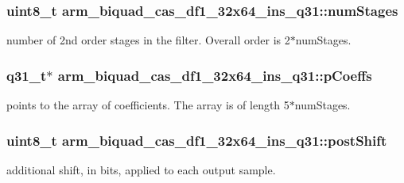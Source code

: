 \subsubsection[{\texorpdfstring{num\+Stages}{numStages}}]{\setlength{\rightskip}{0pt plus 5cm}uint8\+\_\+t arm\+\_\+biquad\+\_\+cas\+\_\+df1\+\_\+32x64\+\_\+ins\+\_\+q31\+::num\+Stages}\hypertarget{structarm__biquad__cas__df1__32x64__ins__q31_ad7cb9a9f5df8f4fcfc7a0b633672e574}{}\label{structarm__biquad__cas__df1__32x64__ins__q31_ad7cb9a9f5df8f4fcfc7a0b633672e574}
number of 2nd order stages in the filter. Overall order is 2$\ast$num\+Stages. 
\subsubsection[{\texorpdfstring{p\+Coeffs}{pCoeffs}}]{\setlength{\rightskip}{0pt plus 5cm}q31\+\_\+t$\ast$ arm\+\_\+biquad\+\_\+cas\+\_\+df1\+\_\+32x64\+\_\+ins\+\_\+q31\+::p\+Coeffs}\hypertarget{structarm__biquad__cas__df1__32x64__ins__q31_a490462d6ebe0fecfb6acbf51bed22ecf}{}\label{structarm__biquad__cas__df1__32x64__ins__q31_a490462d6ebe0fecfb6acbf51bed22ecf}
points to the array of coefficients. The array is of length 5$\ast$num\+Stages. 
\subsubsection[{\texorpdfstring{post\+Shift}{postShift}}]{\setlength{\rightskip}{0pt plus 5cm}uint8\+\_\+t arm\+\_\+biquad\+\_\+cas\+\_\+df1\+\_\+32x64\+\_\+ins\+\_\+q31\+::post\+Shift}\hypertarget{structarm__biquad__cas__df1__32x64__ins__q31_a8e9d58e8dba5aa3b2fc4f36d2ed07996}{}\label{structarm__biquad__cas__df1__32x64__ins__q31_a8e9d58e8dba5aa3b2fc4f36d2ed07996}
additional shift, in bits, applied to each output sample. 
